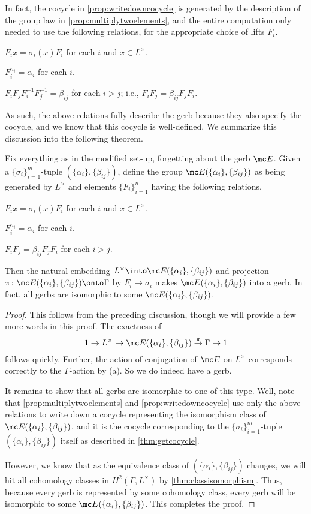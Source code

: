 \documentclass{article}
\numberwithin{equation}{section}
\begin{document}
In fact, the cocycle in \autoref{prop:writedowncocycle} is generated by the description of the group law in \autoref{prop:multiplytwoelements}, and the entire computation only needed to use the following relations, for the appropriate choice of lifts $F_i$.
\begin{listalph}
	\item $F_ix=\sigma_i(x)F_i$ for each $i$ and $x\in L^\times$.
	\item $F_i^{n_i}=\alpha_i$ for each $i$.
	\item $F_iF_jF_i^{-1}F_j^{-1}=\beta_{ij}$ for each $i>j$; i.e., $F_iF_j=\beta_{ij}F_jF_i$.
\end{listalph}
As such, the above relations fully describe the gerb because they also specify the cocycle, and we know that this cocycle is well-defined. We summarize this discussion into the following theorem.
\begin{theorem}
	Fix everything as in the modified set-up, forgetting about the gerb $\mc E$. Given a $\{\sigma_i\}_{i=1}^m$-tuple $(\{\alpha_i\},\{\beta_{ij}\})$, define the group $\mc E(\{\alpha_i\},\{\beta_{ij}\})$ as being generated by $L^\times$ and elements $\{F_i\}_{i=1}^n$ having the following relations.
	\begin{listalph}
		\item $F_ix=\sigma_i(x)F_i$ for each $i$ and $x\in L^\times$.
		\item $F_i^{n_i}=\alpha_i$ for each $i$.
		\item $F_iF_j=\beta_{ij}F_jF_i$ for each $i>j$.
	\end{listalph}
	Then the natural embedding $L^\times\into\mc E(\{\alpha_i\},\{\beta_{ij}\})$ and projection $\pi\colon\mc E(\{\alpha_i\},\{\beta_{ij}\})\onto\Gamma$ by $F_i\mapsto\sigma_i$ makes $\mc E(\{\alpha_i\},\{\beta_{ij}\})$ into a gerb. In fact, all gerbs are isomorphic to some $\mc E(\{\alpha_i\},\{\beta_{ij}\})$.
\end{theorem}
\begin{proof}
	This follows from the preceding discussion, though we will provide a few more words in this proof. The exactness of
	\[1\to L^\times\to\mc E(\{\alpha_i\},\{\beta_{ij}\})\stackrel\pi\to\Gamma\to1\]
	follows quickly. Further, the action of conjugation of $\mc E$ on $L^\times$ corresponds correctly to the $\Gamma$-action by (a). So we do indeed have a gerb.

	It remains to show that all gerbs are isomorphic to one of this type. Well, note that \autoref{prop:multiplytwoelements} and \autoref{prop:writedowncocycle} use only the above relations to write down a cocycle representing the isomorphism class of $\mc E(\{\alpha_i\},\{\beta_{ij}\})$, and it is the cocycle corresponding to the $\{\sigma_i\}_{i=1}^m$-tuple $(\{\alpha_i\},\{\beta_{ij}\})$ itself as described in \autoref{thm:getcocycle}.

	However, we know that as the equivalence class of $(\{\alpha_i\},\{\beta_{ij}\})$ changes, we will hit all cohomology classes in $H^2(\Gamma,L^\times)$ by \autoref{thm:classisomorphism}. Thus, because every gerb is represented by some cohomology class, every gerb will be isomorphic to some $\mc E(\{\alpha_i\},\{\beta_{ij}\})$. This completes the proof.
\end{proof}
\end{document}
